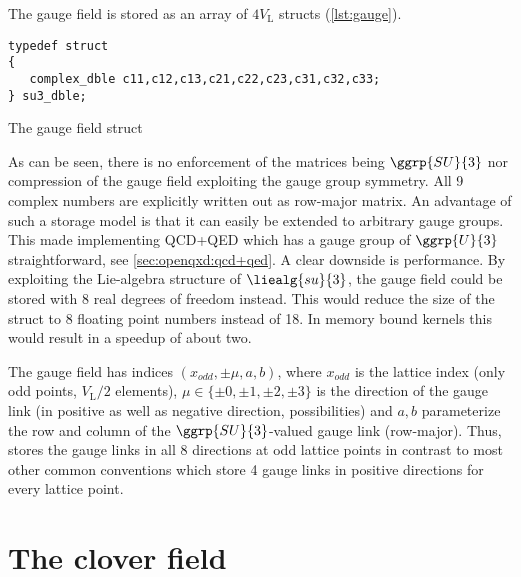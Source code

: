 The gauge field is stored as an array of $4V_\mathrm{L}$  structs (\cref{lst:gauge}).
\begin{codelisting}
\begin{verbatim}
typedef struct
{
   complex_dble c11,c12,c13,c21,c22,c23,c31,c32,c33;
} su3_dble;
\end{verbatim}
\caption{The gauge field struct}
\label{lst:gauge}
\end{codelisting}
As can be seen, there is no enforcement of the matrices being $\ggrp{SU}{3}$ nor compression of the gauge field exploiting the gauge group symmetry. All \num{9} complex numbers are explicitly written out as row-major matrix. An advantage of such a storage model is that it can easily be extended to arbitrary gauge groups. This made implementing QCD+QED which has a gauge group of $\ggrp{U}{3}$ straightforward, see \cref{sec:openqxd:qcd+qed}. A clear downside is performance. By exploiting the Lie-algebra structure of $\liealg{su}{3}$, the gauge field could be stored with \num{8} real degrees of freedom instead. This would reduce the size of the struct to \num{8} floating point numbers instead of \num{18}. In memory bound kernels this would result in a speedup of about two.

The gauge field has indices $(x_{odd}, \pm \mu, a, b)$, where $x_{odd}$ is the lattice index (only odd points, $V_\mathrm{L}/2$ elements), $\mu \in \{\pm 0, \pm 1, \pm 2, \pm 3\}$ is the direction of the gauge link (in positive as well as negative direction,  possibilities) and $a,b$ parameterize the row and column of the $\ggrp{SU}{3}$-valued gauge link (row-major).
Thus, \openqxd stores the gauge links in all \num{8} directions at odd lattice points in contrast to most other common conventions which store \num{4} gauge links in positive directions for every lattice point.

\section{The clover field}
\label{sec:openqxd:clover_field}

